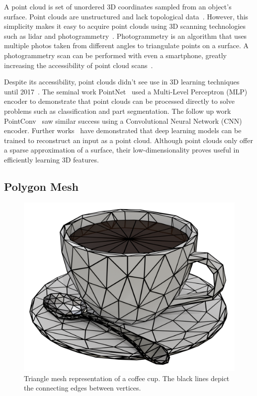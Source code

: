A point cloud is set of unordered 3D coordinates sampled from an object's surface. Point clouds are unstructured and lack topological data~\cite{Xiao2020}. However, this simplicity makes it easy to acquire point clouds using 3D scanning technologies such as lidar and photogrammetry~\cite{Leberl2010}. Photogrammetry is an algorithm that uses multiple photos taken from different angles to triangulate points on a surface. A photogrammetry scan can be performed with even a smartphone, greatly increasing the accessibility of point cloud scans~\cite{Micheletti2015}.

Despite its accessibility, point clouds didn't see use in 3D learning techniques until 2017~\cite{Xiao2020}. The seminal work PointNet~\cite{Qi2017} used a Multi-Level Perceptron (MLP) encoder to demonstrate that point clouds can be processed directly to solve problems such as classification and part segmentation. The follow up work PointConv~\cite{Wu2019} saw similar success using a Convolutional Neural Network (CNN) encoder. Further works~\cite{Fan2017, Achlioptas2018} have demonstrated that deep learning models can be trained to reconstruct an input as a point cloud. Although point clouds only offer a sparse approximation of a surface, their low-dimensionality proves useful in efficiently learning 3D features.


\subsection{Polygon Mesh}
\label{subsec:polygon_mesh}

\begin{figure}[h]
	\centering
	\includegraphics[scale=0.2]{Images/Mesh Cup}
	\caption{Triangle mesh representation of a coffee cup. The black lines depict the connecting edges between vertices.}
	\label{fig:mesh_cup}
\end{figure}

